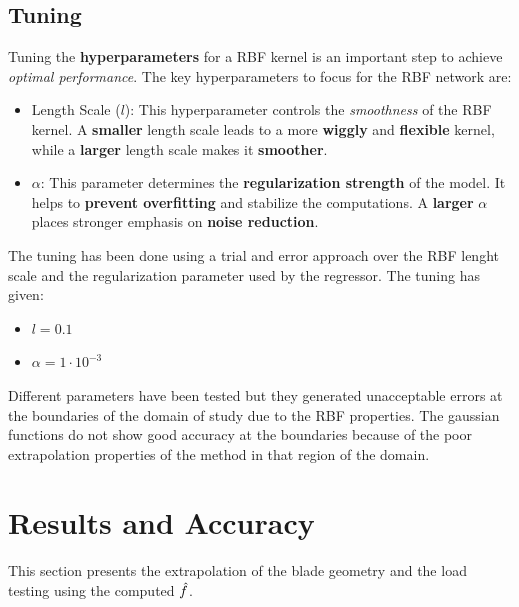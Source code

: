 \subsection{Tuning}

Tuning the \textbf{hyperparameters} for a RBF kernel is an important step to achieve \textit{optimal performance}. 
The key hyperparameters to focus for the RBF network are:

\begin{itemize}
    \item Length Scale ($l$): This hyperparameter controls the \textit{smoothness} of the RBF kernel. A \textbf{smaller} length scale leads to a more \textbf{wiggly} and \textbf{flexible} kernel, while a \textbf{larger} length scale makes it \textbf{smoother}. 
    \item $\alpha$: This parameter determines the \textbf{regularization strength} of the model. It helps to \textbf{prevent overfitting} and stabilize the computations. A \textbf{larger} $\alpha$ places stronger emphasis on \textbf{noise reduction}.
\end{itemize}

The tuning has been done using a trial and error approach over the RBF lenght scale and the regularization parameter used by the regressor. 
The tuning has given:

\begin{itemize}
    \item $l = 0.1$ 
    \item $\alpha = 1 \cdot 10^{-3}$ 
\end{itemize}

Different parameters have been tested but they generated unacceptable errors at the boundaries of the domain of study due to the RBF properties. 
The gaussian functions do not show good accuracy at the boundaries because of the poor extrapolation properties of the method in that region of the domain.

\section{Results and Accuracy}

This section presents the extrapolation of the blade geometry and the load testing using the computed $\hat{\mathnormal{f}}$.

